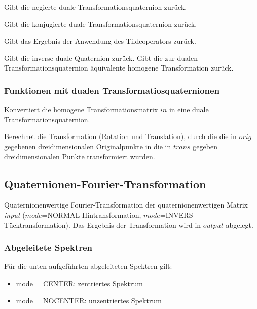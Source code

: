 \descr
{
Gibt die negierte duale Transformationsquaternion zurück.
}

\descr
{
Gibt die konjugierte duale Transformationsquaternion zurück.
}

\descr
{
Gibt das Ergebnis der Anwendung des Tildeoperators zurück.
}

\descr
{
Gibt die inverse duale Quaternion zurück.
}
\descr
{
Gibt die zur dualen Transformationsquaternion äquivalente homogene Transformation zurück.
}
\subsubsection{Funktionen mit dualen Transformatiosquaternionen}
\descr
{
Konvertiert die homogene Transformationsmatrix $in$ 
in eine duale Transformationsquaternion.
}

\descr
{
Berechnet die Transformation (Rotation und Translation), durch die die in $orig$ gegebenen 
dreidimensionalen Originalpunkte in die in $trans$ gegeben dreidimensionalen Punkte
transformiert wurden.
} 
\subsection{Quaternionen-Fourier-Transformation}
\descr
{
Quaternionenwertige Fourier-Transformation der quaternionenwertigen Matrix \textit{input} 
($mode$=NORMAL Hintransformation, $mode$=INVERS Tücktransformation). Das
Ergebnis der Transformation wird in $output$ abgelegt.
}
\subsubsection{Abgeleitete Spektren}
Für die unten aufgeführten abgeleiteten Spektren gilt:
\begin{itemize}
\item mode = CENTER: zentriertes Spektrum
\item mode = NOCENTER: unzentriertes Spektrum
\end{itemize}

